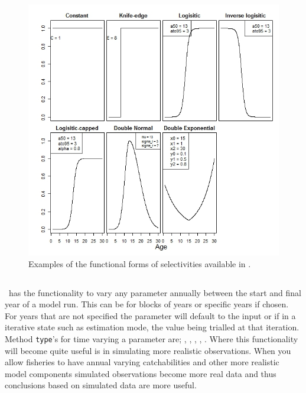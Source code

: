 %
%
\begin{figure}
	\includegraphics[scale = 0.7]{Figures/Selectivities.jpeg}
	\caption{Examples of the functional forms of selectivities available in \CNAME.}
\end{figure}

\subsection{\label{sec:time_var}}

\CNAME\ has the functionality to vary any parameter annually between the start and final year of a model run. This can be for blocks of years or specific years if chosen. For years that are not specified the parameter will default to the input or if in a iterative state such as estimation mode, the value being trialled at that iteration. Method \texttt{type}'s for time varying a parameter are; , , , , . Where this functionality will become quite useful is in simulating more realistic observations. When you allow fisheries to have annual varying catchabilities and other more realistic model components simulated observations become more real data and thus conclusions based on simulated data are more useful.

